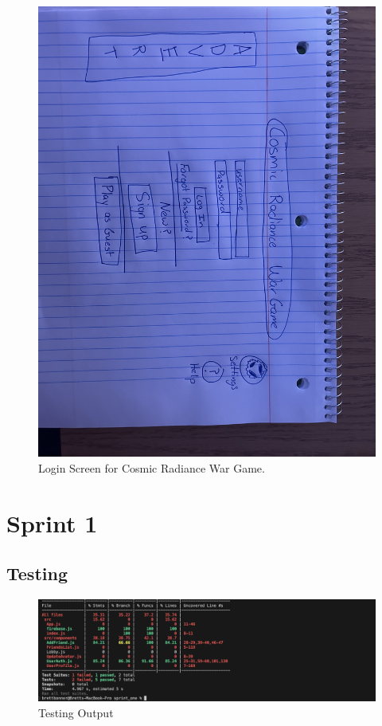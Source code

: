 \documentclass[12pt]{article} %
\begin{document}
\begin{figure}
    \centering
    \includegraphics[width=1\linewidth]{figures/Login UI.jpeg}
    \caption{Login Screen for Cosmic Radiance War Game.}
    \label{fig:enter-label}
\end{figure}


\pagebreak

\section {Sprint 1}
\subsection {Testing}
\begin{figure} [h]
    \centering
    \includegraphics[width=1\linewidth]{figures/Testing.png}
    \caption{Testing Output}
    \label{fig:enter-label}
\end{figure}
\end{document}
